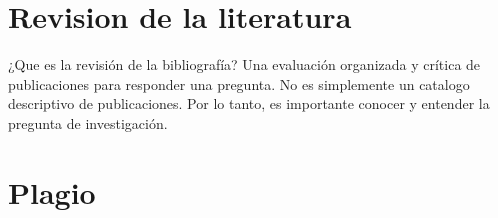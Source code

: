 \documentclass[
10pt,
aspectratio=169,
]{beamer}
\begin{document}
\section{Revision de la literatura}
\begin{frame}[c]{¿Que es la revisi\'on de la bibliograf\'ia?}
\alert{Una evaluación organizada y crítica de publicaciones para responder una pregunta.}
\alert{No es simplemente un catalogo descriptivo de publicaciones.} 
\alert{Por lo tanto, es importante conocer y entender la pregunta de investigaci\'on.}
\end{frame}

%
\section{Plagio}
\end{document}
